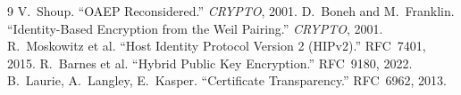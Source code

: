\documentclass[11pt,a4paper]{article}
\theoremstyle{definition}
\theoremstyle{remark}
\begin{document}

\begin{thebibliography}{9}
V.~Shoup. ``OAEP Reconsidered.'' \emph{CRYPTO}, 2001.
D.~Boneh and M.~Franklin. ``Identity-Based Encryption from the Weil
Pairing.'' \emph{CRYPTO}, 2001.
R.~Moskowitz et al. ``Host Identity Protocol Version 2 (HIPv2).''
RFC~7401, 2015.
R.~Barnes et al. ``Hybrid Public Key Encryption.'' RFC~9180, 2022.
B.~Laurie, A.~Langley, E.~Kasper. ``Certificate Transparency.''
RFC~6962, 2013.
\end{thebibliography}
\end{document}
